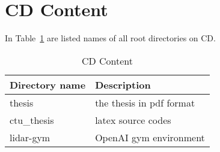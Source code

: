 \section{CD Content}

In Table~\ref{tab:obsah} are listed names of all root directories on CD.

\vspace{1cm}
\begin{table}[!htb]
\centering
\begin{tabular}{lp{10cm}}
\textbf{Directory name} & \textbf{Description} \\

\hline
thesis & the thesis in pdf format \\
ctu\_thesis & latex source codes \\
lidar-gym & OpenAI gym environment \\
\hline
\end{tabular}
\caption{CD Content}
\label{tab:obsah}
\end{table}
